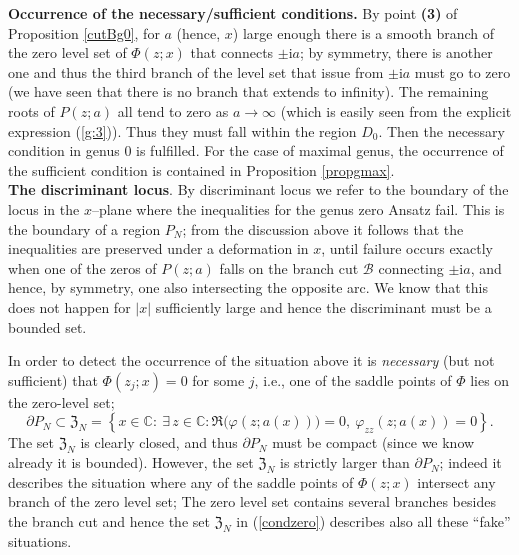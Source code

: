 \documentclass[10pt,reqno,oneside]{amsart}
\newcommand{\im}{\mathrm{i}}
\numberwithin{equation}{section}
\def\le{\left}
\def\ri{\right}
\def\be{\begin{equation}}
\def\ee{\end{equation}}
\def \pa{\partial}
\def\C{{\mathbb C}}
\def\eqref#1{(\ref{#1})}
\begin{document}
% 
{\bf Occurrence of the necessary/sufficient conditions.} 
By point {\bf (3)} of Proposition  \ref{cutBg0}, for $a$ (hence, $x$) large enough there is a smooth branch of the zero level set of $\Phi(z;x)$ that connects $\pm\im a$; by symmetry, there is another one and thus the third branch of the level set that issue from $\pm\im a$ must go to zero (we have seen that there is no branch that extends to infinity). The remaining roots of $P(z;a)$ all tend to zero as $a\to \infty$ (which is easily seen from the explicit expression \eqref{g:3}). Thus they must fall within the region $D_0$. Then the necessary condition in genus $0$  is fulfilled. For the case of maximal genus, the occurrence of the sufficient condition is contained in Proposition \ref{propgmax}.\\
%

{\bf The discriminant locus}.
By discriminant locus we refer to the boundary of the locus in the $x$--plane where the inequalities for the genus zero Ansatz fail. This is the boundary of a region $P_N$; from the discussion above it follows 
 that the inequalities are preserved under a deformation in $x$, until failure occurs exactly when  one of the zeros of $P(z;a)$ falls on the branch cut $\mathcal{B}$ connecting $\pm\im a$, and hence, by symmetry, one also intersecting the opposite arc. We know that this does not happen for $|x|$ sufficiently large and hence the discriminant must be a bounded set.\smallskip
 
 In order to detect the occurrence of the situation above it is {\em necessary} (but not sufficient) that 
 $\Phi(z_j;x) =0$ for some $j$, i.e., one of the  saddle points of $\Phi$ lies on the zero-level set;
 \be
 \pa P_N \subset  
 \mathfrak Z_N=
  \le\{ 
 x\in \C:\ \exists\,z\in \C: 
\Re\big(\varphi(z;a(x))\big) = 0,\ 
\varphi_{zz}(z;a(x)) = 0
 \ri\}
 \label{condzero}.
 \ee 
 The set $\mathfrak Z_N$ is clearly closed, and thus $\pa P_N$ must be compact (since we know already it is bounded). However, the set $\mathfrak Z_N$ is strictly larger than $\pa P_N$; indeed it describes the situation where any of the saddle points of $\Phi(z;x)$ intersect any branch of the zero level set; The zero level set contains several branches besides the branch cut and hence the set $\mathfrak Z_N$ in \eqref{condzero} describes also all these ``fake'' situations.\smallskip
 
\end{document}
